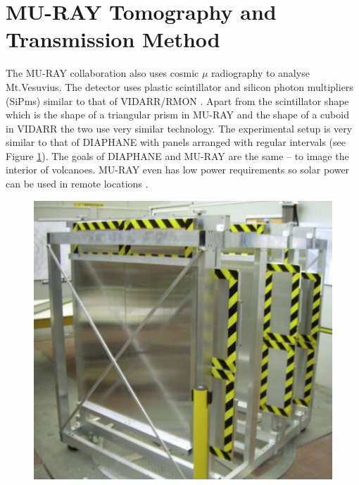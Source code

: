 \section{MU-RAY Tomography and Transmission Method} \label{sec:murayTomographyAndTransmissionMethod}
The MU-RAY collaboration also uses cosmic $\mu$ radiography to analyse Mt.Vesuvius. The detector uses plastic scintillator and silicon photon multipliers (SiPms) similar to that of VIDARR/RMON \cite{ANASTASIO2013423} \cite{Ambrosino_2014}. Apart from the scintillator shape which is the shape of a triangular prism in MU-RAY and the shape of a cuboid in VIDARR the two use very similar technology. The experimental setup is very similar to that of DIAPHANE with panels arranged with regular intervals (see Figure \ref{fig:muRayDetectors}). The goals of DIAPHANE and MU-RAY are the same -- to image the interior of volcanoes. MU-RAY even has low power requirements so solar power can be used in remote locations \cite{ANASTASIO2013423}. 

\begin{figure}[!h]
 \centering
 \includegraphics[width=0.5\linewidth]{Chapter5/Figs/Raster/muRayDetectors.png}
 \label{fig:muRayDetectors}
\end{figure}

